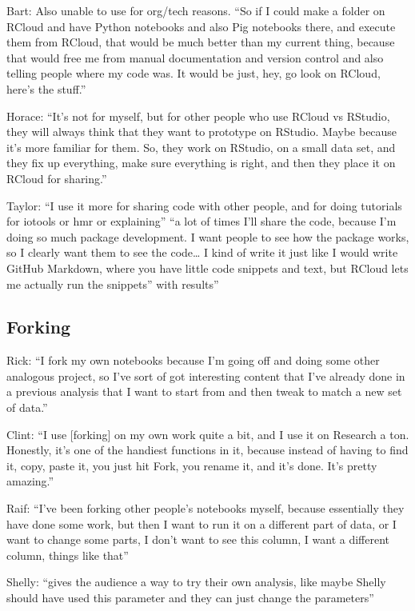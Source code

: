 Bart: Also unable to use for org/tech reasons. ``So if I could make a folder on RCloud and have Python notebooks and also Pig notebooks there, and execute them from RCloud, that would be much better than my current thing, because that would free me from manual documentation and version control and also telling people where my code was. It would be just, hey, go look on RCloud, here's the stuff.''

Horace: ``It's not for myself, but for other people who use RCloud vs RStudio, they will always think that they want to prototype on RStudio. Maybe because it's more familiar for them. So, they work on RStudio, on a small data set, and they fix up everything, make sure everything is right, and then they place it on RCloud for sharing.''

Taylor: ``I use it more for sharing code with other people, and for doing tutorials for iotools or hmr or explaining'' ``a lot of times I'll share the code, because I'm doing so much package development. I want people to see how the package works, so I clearly want them to see the code… I kind of write it just like I would write GitHub Markdown, where you have little code snippets and text, but RCloud lets me actually run the snippets” with results''


\subsection{Forking}
Rick: ``I fork my own notebooks because I'm going off and doing some other analogous project, so I've sort of got interesting content that I've already done in a previous analysis that I want to start from and then tweak to match a new set of data.''

Clint: ``I use [forking] on my own work quite a bit, and I use it on Research a ton. Honestly, it's one of the handiest functions in it, because instead of having to find it, copy, paste it, you just hit Fork, you rename it, and it's done. It's pretty amazing.''

Raif: ``I've been forking other people's notebooks myself, because essentially they have done some work, but then I want to run it on a different part of data, or I want to change some parts, I don't want to see this column, I want a different column, things like that''

Shelly: ``gives the audience a way to try their own analysis, like maybe Shelly should have used this parameter and they can just change the parameters''

